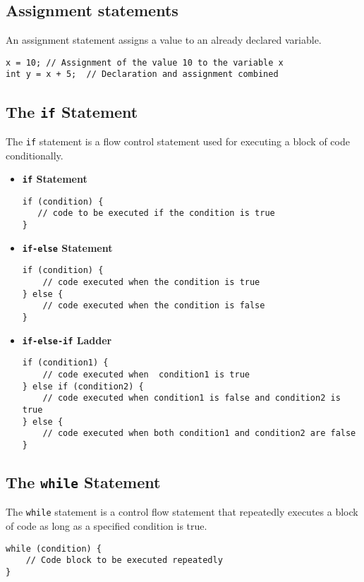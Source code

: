 \documentclass[11pt,A4]{article}
\begin{document}
        \subsection{Assignment statements}
        An assignment statement assigns a value to an already declared variable.
        \begin{lstlisting}
x = 10; // Assignment of the value 10 to the variable x
int y = x + 5;  // Declaration and assignment combined
        \end{lstlisting}
        
        \subsection{The \texttt{if} Statement}
        The \texttt{if} statement is a flow control statement used for executing a block of code conditionally.
        \begin{itemize}
            \item \textbf{\texttt{if} Statement}
            \begin{lstlisting}
if (condition) {
   // code to be executed if the condition is true
}
            \end{lstlisting}
            
            \item \textbf{\texttt{if-else} Statement}
            \begin{lstlisting}
if (condition) {
    // code executed when the condition is true
} else {
    // code executed when the condition is false
}
            \end{lstlisting}

            \item \textbf{\texttt{if-else-if} Ladder}
            \begin{lstlisting}
if (condition1) {
    // code executed when  condition1 is true
} else if (condition2) { 
    // code executed when condition1 is false and condition2 is true
} else {
    // code executed when both condition1 and condition2 are false
}
            \end{lstlisting}
        \end{itemize}
        
        \subsection{The \texttt{while} Statement}
        The \texttt{while} statement is a control flow statement that repeatedly executes a block of code as long as a specified condition is true.
        \begin{lstlisting}
while (condition) {
    // Code block to be executed repeatedly
}
        \end{lstlisting}
        
\end{document}
